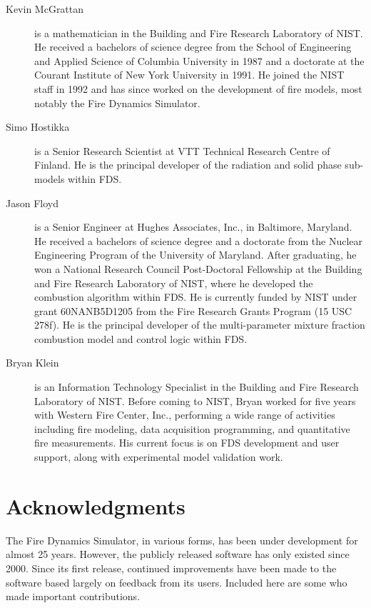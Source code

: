 \documentclass[11pt]{book}
\begin{document}
\begin{description}
\item[Kevin McGrattan] is a mathematician in the Building and Fire
Research Laboratory of NIST. He received a bachelors of science degree
from the School of Engineering and Applied Science of Columbia
University in 1987 and a doctorate at the Courant Institute of New
York University in 1991. He joined the NIST staff in 1992 and has
since worked on the development of fire models, most notably the Fire
Dynamics Simulator.
\item[Simo Hostikka] is a Senior Research Scientist at VTT Technical
Research Centre of Finland.  He is the principal developer of the
radiation and solid phase sub-models within FDS.
\item[Jason Floyd] is a Senior Engineer at Hughes Associates, Inc., in
Baltimore, Maryland. He received a bachelors of science degree and a
doctorate from the Nuclear Engineering Program of the University of
Maryland. After graduating, he won a National Research Council
Post-Doctoral Fellowship at the Building and Fire Research Laboratory
of NIST, where he developed the combustion algorithm within FDS. He is
currently funded by NIST under grant 60NANB5D1205 from the Fire
Research Grants Program (15 USC 278f).  He is the principal developer
of the multi-parameter mixture fraction combustion model and control
logic within FDS.
\item[Bryan Klein] is an Information Technology Specialist in the
Building and Fire Research Laboratory of NIST.  Before coming to NIST,
Bryan worked for five years with Western Fire Center, Inc., performing a
wide range of activities including fire modeling, data acquisition programming,
and quantitative fire measurements. His current focus is on FDS development and
user support, along with experimental model validation work.
\end{description}



\chapter{Acknowledgments}

The Fire Dynamics Simulator, in various forms, has been under development for almost 25 years. However,
the publicly released software has only existed since 2000. Since its first release, continued improvements
have been made to the software based largely on feedback from its users.
Included here are some who made important contributions.
\end{document}
